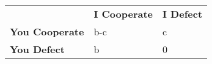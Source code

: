 \begin{table}[h]
\begin{tabular}{lll}
             & \textbf{I Cooperate} & \textbf{I Defect} \\
\textbf{You Cooperate} & b-c         & c        \\
\textbf{You Defect}    & b           & 0       
\end{tabular}
\end{table}

